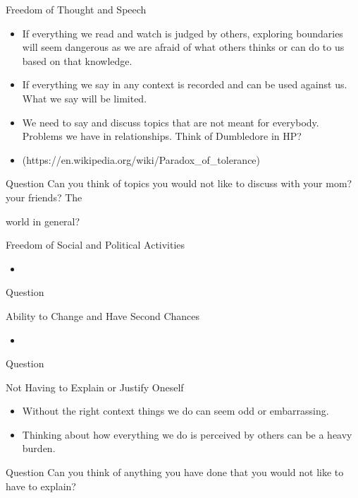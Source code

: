 \documentclass{beamer}
\begin{document}
\begin{frame}{Freedom of Thought and Speech}
\begin{itemize}
  \item If everything we read and watch is judged by others, exploring boundaries will seem dangerous as we are afraid of what others thinks or can do to us based on that knowledge.
  \item If everything we say in any context is recorded and can be used against us. What we say will be limited.
  \item We need to say and discuss topics that are not meant for everybody. Problems we have in relationships. Think of Dumbledore in HP?
  \item [Paradox of tolerance](https://en.wikipedia.org/wiki/Paradox_of_tolerance)
\end{itemize}
\begin{block}{Question}
Can you think of topics you would not like to discuss with your mom? your friends? The
\end{block} world in general?
\end{frame}


\begin{frame}{Freedom of Social and Political Activities}
\begin{itemize}
  \item
\end{itemize}
\begin{block}{Question}

\end{block}
\end{frame}


\begin{frame}{Ability to Change and Have Second Chances}
\begin{itemize}
  \item
\end{itemize}
\begin{block}{Question}

\end{block}
\end{frame}


\begin{frame}{Not Having to Explain or Justify Oneself}
\begin{itemize}
  \item Without the right context things we do can seem odd or embarrassing.
  \item Thinking about how everything we do is perceived by others can be a heavy burden.
\end{itemize}
\begin{block}{Question}
Can you think of anything you have done that you would not like to have to explain?
\end{block}
\end{frame}
\end{document}
